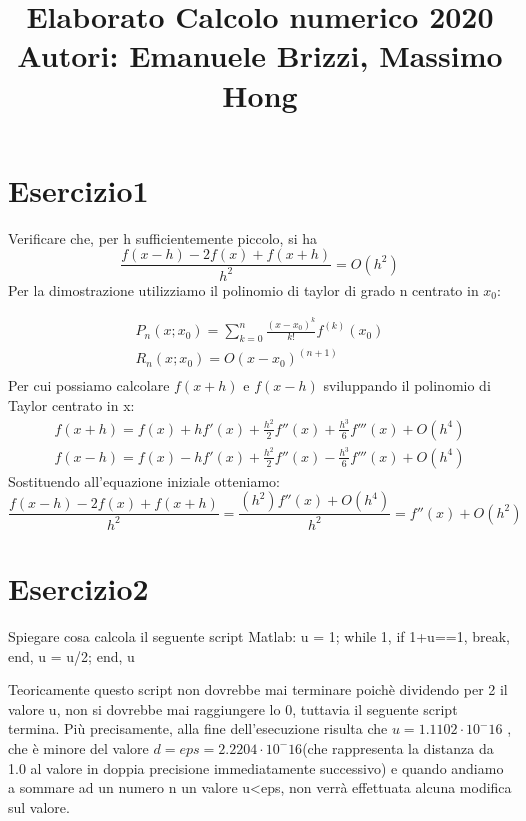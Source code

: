 \documentclass[12pt]{article}
\begin{document}
\title{Elaborato Calcolo numerico 2020\\  Autori: Emanuele Brizzi, Massimo Hong}
\maketitle
\newpage
\tableofcontents
\cleardoublepage

\section{Esercizio1}

Verificare che, per h sufficientemente piccolo, si ha \\

\begin{equation*}
\frac{f(x-h)-2f(x)+f(x+h)}{h^2} = O(h^2)
\end{equation*}
Per la dimostrazione utilizziamo il polinomio di taylor di grado n centrato in $x_0:$

\begin{gather*}
P_n(x;x_0) = \sum_{k=0}^{n}\frac{(x-x_0)^k}{k!}f^{(k)}(x_0)\\
R_n(x;x_0) = O(x-x_0)^{(n+1)}\\
\end{gather*}
Per cui possiamo calcolare $f(x+h)$ e $f(x-h)$ sviluppando il polinomio di Taylor centrato in x: \\
\begin{gather*}
f(x+h) = f(x)+hf'(x)+\frac{h^2}{2}f''(x)+\frac{h^3}{6}f'''(x)+O(h^4)\\
f(x-h) = f(x)-hf'(x)+\frac{h^2}{2}f''(x)-\frac{h^3}{6}f'''(x)+O(h^4)
\end{gather*}
Sostituendo all'equazione iniziale otteniamo: \\
\begin{equation*}	
\frac{f(x-h)-2f(x)+f(x+h)}{h^2}  = \frac{(h^2)f''(x)+O(h^4)}{h^2}=  f''(x)+O(h^2)
\end{equation*}



\section{Esercizio2}
Spiegare cosa calcola il seguente script Matlab:
u = 1; while 1, if 1+u==1, break, end, u = u/2; end, u

Teoricamente questo script non dovrebbe mai terminare poichè dividendo per 2 il valore u, non si dovrebbe mai raggiungere lo 0, tuttavia il seguente script termina. Più precisamente, alla fine dell'esecuzione  risulta che $u = 1.1102\cdot10^-16$ , che è minore del valore $d = eps = 2.2204\cdot10^-16$(che rappresenta la distanza da 1.0 al valore in doppia precisione immediatamente successivo) e quando andiamo a sommare ad un numero n un valore u<eps, non verrà effettuata alcuna modifica sul valore.
\end{document}
